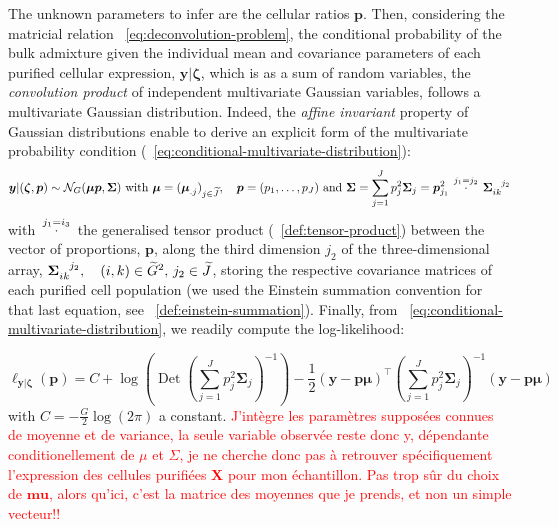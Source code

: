 \documentclass[long, final]{jobim}
\newcommand{\cdotT}[1]{\stackrel{\mathclap{
#1}}{\quad \cdot \quad}}
\DeclareMathOperator*{\DET}{Det}
\begin{document}
The unknown parameters to infer are the cellular ratios $\boldsymbol{p}$. Then, considering the matricial relation \equationname ~\ref{eq:deconvolution-problem}, the conditional probability of the bulk admixture given the individual mean and covariance parameters of each purified cellular expression, $\boldsymbol{y}|\boldsymbol{\zeta}$, which is as a sum of random variables, the \textit{convolution product} of independent multivariate Gaussian variables, follows a multivariate Gaussian distribution. Indeed, the \textit{affine invariant} property of Gaussian distributions enable to derive an explicit form of the multivariate probability condition (\equationname~\ref{eq:conditional-multivariate-distribution}):
\begin{equation}
\label{eq:conditional-multivariate-distribution}
\boldsymbol{y}|(\boldsymbol{\zeta}, \boldsymbol{p}) \sim \mathcal{N}_G(\boldsymbol{\mu} \boldsymbol{p}, \boldsymbol{\Sigma}) \text{ with } \boldsymbol{\mu} = (\boldsymbol{\mu}_{.j})_{j \in \widetilde{J}}, \quad \boldsymbol {p}=(p_1, \ldots, p_J) \text{ and } \boldsymbol{\Sigma}=\sum_{j=1}^J p_{j}^2\boldsymbol{\Sigma}_{j}=
\boldsymbol{p}_{j_1}^2 \cdotT{j_1=j_2} \boldsymbol{\Sigma}\indices{_{ik}^{j_2}}
\end{equation}
with $\cdotT{j_1=i_3}$ the generalised tensor product (~\ref{def:tensor-product}) between the vector of proportions, $\boldsymbol{p}$, along the third dimension $j_2$ of the three-dimensional array, $\boldsymbol{\Sigma}\indices{_{ik}^{j_2}}, \quad (i, k)\in \widetilde{G}^2, \, j_2 \in \widetilde{J}$, storing the respective covariance matrices of each purified cell population (we used the Einstein summation convention for that last equation, see ~\ref{def:einstein-summation}). 
Finally, from \equationname~\ref{eq:conditional-multivariate-distribution}, we readily compute the log-likelihood:

\begin{equation}
\label{eq:loglikelihood-multivariate-gaussian}
\ell_{\boldsymbol{y} | \boldsymbol{\zeta}}(\boldsymbol{p})=C + \log\left(\DET \left(\sum_{j=1}^J p_{j}^2\boldsymbol{\Sigma}_{j}\right)^{-1}\right) - \frac{1}{2} (\boldsymbol{y} - \boldsymbol{p} \boldsymbol{\mu})^\top \left(\sum_{j=1}^J p_{j}^2\boldsymbol{\Sigma}_{j}\right)^{-1} (\boldsymbol{y} - \boldsymbol{p}\boldsymbol{\mu})
\end{equation} with $C=-\frac{G}{2}\log(2\pi)$ a constant. 
\textcolor{red}{J'intègre les paramètres supposées connues de moyenne et de variance, la seule variable observée reste donc y, dépendante conditionellement de $\mu$ et $\Sigma$, je ne cherche donc pas à retrouver spécifiquement l'expression des cellules purifiées $\boldsymbol{X}$ pour mon échantillon. Pas trop sûr du choix de $\boldsymbol{mu}$, alors qu'ici, c'est la matrice des moyennes que je prends, et non un simple vecteur!!}
\end{document}

